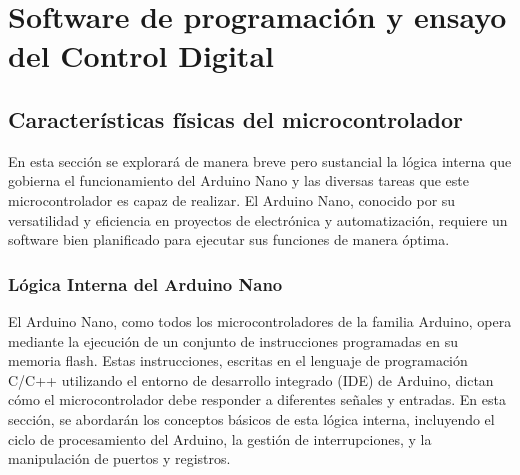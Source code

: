 \chapter{Software de programación y ensayo del Control Digital}

\label{C:Software de programación y ensayo del Control Digital}

\section{Características físicas del microcontrolador}
En esta sección se explorará de manera breve pero sustancial la lógica interna que gobierna el funcionamiento del Arduino Nano y las diversas tareas que este microcontrolador es capaz de realizar. El Arduino Nano, conocido por su versatilidad y eficiencia en proyectos de electrónica y automatización, requiere un software bien planificado para ejecutar sus funciones de manera óptima.

\subsection{Lógica Interna del Arduino Nano}
El Arduino Nano, como todos los microcontroladores de la familia Arduino, opera mediante la ejecución de un conjunto de instrucciones programadas en su memoria flash. Estas instrucciones, escritas en el lenguaje de programación C/C++ utilizando el entorno de desarrollo integrado (IDE) de Arduino, dictan cómo el microcontrolador debe responder a diferentes señales y entradas. En esta sección, se abordarán los conceptos básicos de esta lógica interna, incluyendo el ciclo de procesamiento del Arduino, la gestión de interrupciones, y la manipulación de puertos y registros.

